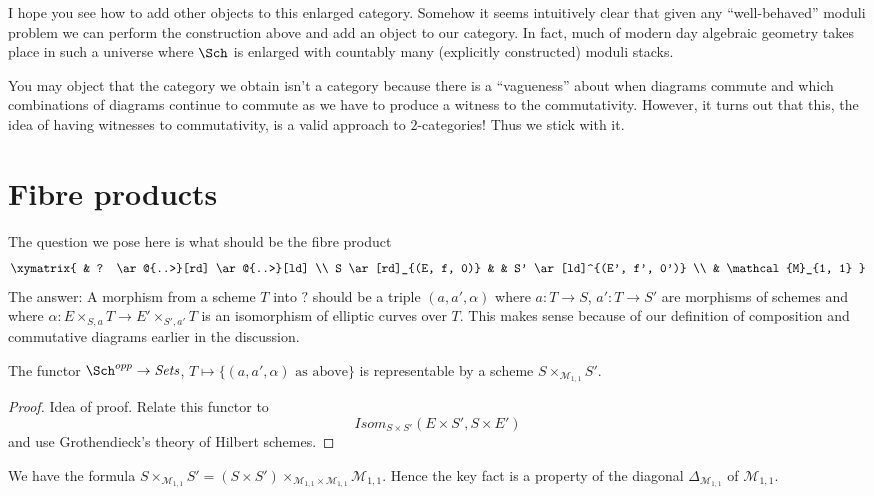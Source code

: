 \medskip\noindent
I hope you see how to add other objects to this enlarged category.
Somehow it seems intuitively clear that given any ``well-behaved''
moduli problem we can perform the construction above and add an object
to our category. In fact, much of modern day algebraic geometry takes
place in such a universe where $\Sch$ is enlarged with countably many
(explicitly constructed) moduli stacks.

\medskip\noindent
You may object that the category we obtain isn't a category because
there is a ``vagueness'' about when diagrams commute and which combinations
of diagrams continue to commute as we have to produce a witness
to the commutativity. However, it turns out that this, the idea of having
witnesses to commutativity, is a valid approach to $2$-categories!
Thus we stick with it.






\section{Fibre products}
\label{section-fibre-products}

\noindent
The question we pose here is what should be the fibre product
$$
\xymatrix{
& ? \ar@{..>}[rd] \ar@{..>}[ld] \\
S \ar[rd]_{(E, f, 0)} & & S' \ar[ld]^{(E', f', 0')} \\
& \mathcal{M}_{1, 1}
}
$$
The answer: A morphism from a scheme $T$ into $?$ should be a triple
$(a, a', \alpha)$ where
$a : T \to S$, $a' : T \to S'$ are morphisms of schemes
and where $\alpha : E \times_{S, a} T \to E' \times_{S', a'} T$ is
an isomorphism of elliptic curves over $T$. This makes sense
because of our definition of composition and commutative diagrams
earlier in the discussion.

\begin{lemma}
\label{lemma-key-fact}
The functor $\Sch^{opp} \to \textit{Sets}$,
$T \mapsto \{(a, a', \alpha)\text{ as above}\}$
is representable by a scheme $S \times_{\mathcal{M}_{1, 1}} S'$.
\end{lemma}

\begin{proof}
Idea of proof. Relate this functor to
$$
\mathit{Isom}_{S \times S'}(E \times S', S \times E')
$$
and use Grothendieck's theory of Hilbert schemes.
\end{proof}

\begin{remark}
\label{remark-diagonal}
We have the formula
$S \times_{\mathcal{M}_{1, 1}} S' =
(S \times S')
\times_{\mathcal{M}_{1, 1} \times \mathcal{M}_{1, 1}}
\mathcal{M}_{1, 1}$.
Hence the key fact is a property of the diagonal
$\Delta_{\mathcal{M}_{1, 1}}$ of $\mathcal{M}_{1, 1}$.
\end{remark}

